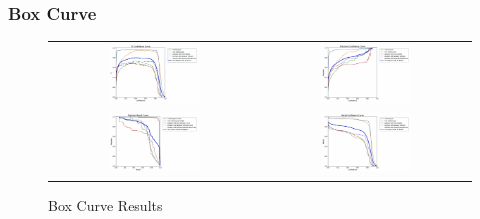 \begin{refsection}
\begin{refsection}
\subsubsection{Box Curve}
\begin{figure}[H]
\centering
\begin{tabular}{cc}
\includegraphics[width=0.45\textwidth]{figures/Fig18a.jpg} &
\includegraphics[width=0.45\textwidth]{figures/Fig18b.jpg} \\
\includegraphics[width=0.45\textwidth]{figures/Fig18c.jpg} &
\includegraphics[width=0.45\textwidth]{figures/Fig18d.jpg} \\
\end{tabular}
\caption{Box Curve Results}
\label{fig:box_curve}
\end{figure}


\end{refsection}
\end{refsection}
